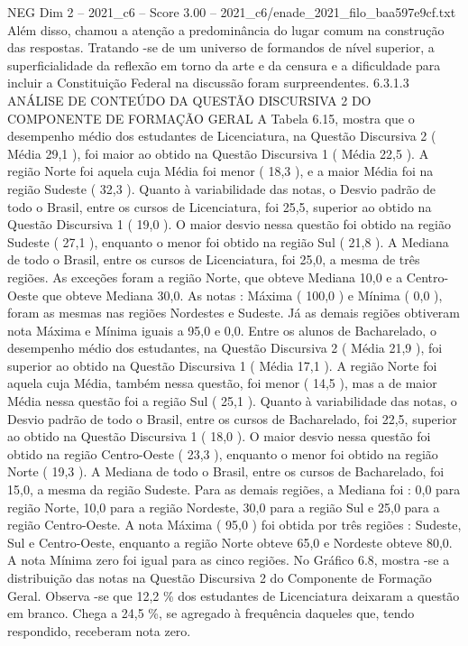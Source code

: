 \begin{textsample}{NEG Dim 2 – 2021\_c6 – Score 3.00 – 2021\_c6/enade\_2021\_filo\_baa597e9cf.txt}
Além disso, chamou a atenção a predominância do lugar comum na construção das respostas.
Tratando -se de um universo de formandos de nível superior, a superficialidade da reflexão em torno da arte e da censura e a dificuldade para incluir a Constituição Federal na discussão foram surpreendentes. 6.3.1.3 ANÁLISE DE CONTEÚDO DA QUESTÃO DISCURSIVA 2 DO COMPONENTE DE FORMAÇÃO GERAL A Tabela 6.15, mostra que o desempenho médio dos estudantes de Licenciatura, na Questão Discursiva 2 ( Média 29,1 ), foi maior ao obtido na Questão Discursiva 1 ( Média 22,5 ).
A região Norte foi aquela cuja Média foi menor ( 18,3 ), e a maior Média foi na região Sudeste ( 32,3 ).
Quanto à variabilidade das notas, o Desvio padrão de todo o Brasil, entre os cursos de Licenciatura, foi 25,5, superior ao obtido na Questão Discursiva 1 ( 19,0 ).
O maior desvio nessa questão foi obtido na região Sudeste ( 27,1 ), enquanto o menor foi obtido na região Sul ( 21,8 ).
A Mediana de todo o Brasil, entre os cursos de Licenciatura, foi 25,0, a mesma de três regiões.
As exceções foram a região Norte, que obteve Mediana 10,0 e a Centro-Oeste que obteve Mediana 30,0.
As notas : Máxima ( 100,0 ) e Mínima ( 0,0 ), foram as mesmas nas regiões Nordestes e Sudeste.
Já as demais regiões obtiveram nota Máxima e Mínima iguais a 95,0 e 0,0.
Entre os alunos de Bacharelado, o desempenho médio dos estudantes, na Questão Discursiva 2 ( Média 21,9 ), foi superior ao obtido na Questão Discursiva 1 ( Média 17,1 ).
A região Norte foi aquela cuja Média, também nessa questão, foi menor ( 14,5 ), mas a de maior Média nessa questão foi a região Sul ( 25,1 ).
Quanto à variabilidade das notas, o Desvio padrão de todo o Brasil, entre os cursos de Bacharelado, foi 22,5, superior ao obtido na Questão Discursiva 1 ( 18,0 ).
O maior desvio nessa questão foi obtido na região Centro-Oeste ( 23,3 ), enquanto o menor foi obtido na região Norte ( 19,3 ).
A Mediana de todo o Brasil, entre os cursos de Bacharelado, foi 15,0, a mesma da região Sudeste.
Para as demais regiões, a Mediana foi : 0,0 para região Norte, 10,0 para a região Nordeste, 30,0 para a região Sul e 25,0 para a região Centro-Oeste.
A nota Máxima ( 95,0 ) foi obtida por três regiões : Sudeste, Sul e Centro-Oeste, enquanto a região Norte obteve 65,0 e Nordeste obteve 80,0.
A nota Mínima zero foi igual para as cinco regiões.
No Gráfico 6.8, mostra -se a distribuição das notas na Questão Discursiva 2 do Componente de Formação Geral.
Observa -se que 12,2 \% dos estudantes de Licenciatura deixaram a questão em branco.
Chega a 24,5 \%, se agregado à frequência daqueles que, tendo respondido, receberam nota zero.

\end{textsample}
